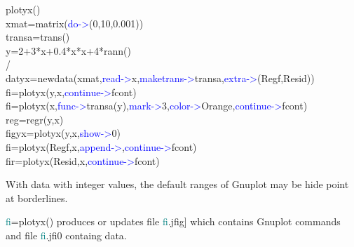 \begin{example}[plotyxex]plotyx()\\
\label{plotyxex}
xmat=\textcolor{VioletRed}{matrix}(\textcolor{blue}{do->}(0,10,0.001))\\
transa=\textcolor{VioletRed}{trans}()\\
y=2+3*x+0.4*x*x+4*rann()\\
/\\
datyx=\textcolor{VioletRed}{newdata}(xmat,\textcolor{blue}{read->}x,\textcolor{blue}{maketrans->}transa,\textcolor{blue}{extra->}(Regf,Resid))\\
fi=\textcolor{VioletRed}{plotyx}(y,x,\textcolor{blue}{continue->}fcont)\\
fi=\textcolor{VioletRed}{plotyx}(x,\textcolor{blue}{func->}transa(y),\textcolor{blue}{mark->}3,\textcolor{blue}{color->}Orange,\textcolor{blue}{continue->}fcont)\\
reg=\textcolor{VioletRed}{regr}(y,x)\\
figyx=\textcolor{VioletRed}{plotyx}(y,x,\textcolor{blue}{show->}0)\\
fi=\textcolor{VioletRed}{plotyx}(Regf,x,\textcolor{blue}{append->},\textcolor{blue}{continue->}fcont)\\
fir=\textcolor{VioletRed}{plotyx}(Resid,x,\textcolor{blue}{continue->}fcont)
\end{example}
\begin{note}
With data with integer values, the default ranges of Gnuplot may be hide point at
borderlines.
\end{note}
\begin{note}
\textcolor{teal}{fi}=\textcolor{VioletRed}{plotyx}() produces or updates file \textcolor{teal}{fi}.jfig] which contains
Gnuplot commands and file \textcolor{teal}{fi}.jfi0 containg data.
\end{note}
